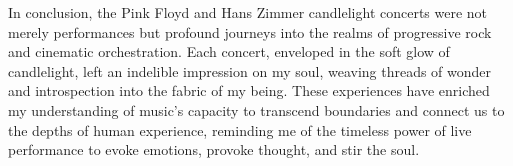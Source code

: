 In conclusion, the Pink Floyd and Hans Zimmer candlelight concerts were not merely performances but profound journeys into the realms of progressive rock and cinematic orchestration. Each concert, enveloped in the soft glow of candlelight, left an indelible impression on my soul, weaving threads of wonder and introspection into the fabric of my being. These experiences have enriched my understanding of music's capacity to transcend boundaries and connect us to the depths of human experience, reminding me of the timeless power of live performance to evoke emotions, provoke thought, and stir the soul.